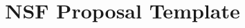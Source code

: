 \documentclass{NSF}
\begin{document}

\title{NSF Proposal Template}



\newpage{}


\newpage{}
\renewcommand\refname{References Cited}



\newpage{}


\newpage{}


\newpage{}


\newpage{}


\newpage{}
\end{document}
